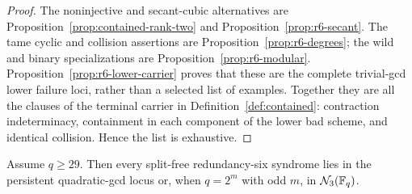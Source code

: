 \begin{proof}
The noninjective and secant-cubic alternatives are
Proposition~\ref{prop:contained-rank-two} and
Proposition~\ref{prop:r6-secant}.  The tame cyclic and collision
assertions are Proposition~\ref{prop:r6-degrees}; the wild and binary
specializations are Proposition~\ref{prop:r6-modular}.
Proposition~\ref{prop:r6-lower-carrier} proves that these are the
complete trivial-gcd lower failure loci, rather than a selected list
of examples.  Together they are all the clauses of the terminal carrier in
Definition~\ref{def:contained}: contraction
indeterminacy, containment in each component of the lower bad scheme,
and identical collision.  Hence the list is exhaustive.
\end{proof}

\begin{proposition}\label{prop:r6-one-step}%
%
%
Assume \(q\geq29\).
Then every split-free redundancy-six syndrome lies in the persistent
quadratic-gcd locus or, when \(q=2^m\) with odd \(m\), in
\(\mathcal N_3(\mathbb F_q)\).
\end{proposition}

